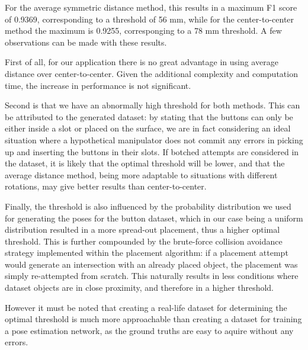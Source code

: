 For the average symmetric distance method, this results in a maximum F1 score of 0.9369, corresponding to a threshold of 56 mm, while for the center-to-center method the maximum is 0.9255, corresponging to a 78 mm threshold. A few observations can be made with these results.

First of all, for our application there is no great advantage in using average distance over center-to-center. Given the additional complexity and computation time, the increase in performance is not significant.

Second is that we have an abnormally high threshold for both methods. This can be attributed to the generated dataset: by stating that the buttons can only be either inside a slot or placed on the surface, we are in fact considering an ideal situation where a hypothetical manipulator does not commit any errors in picking up and inserting the buttons in their slots. If botched attempts are considered in the dataset, it is likely that the optimal threshold will be lower, and that the average distance method, being more adaptable to situations with different rotations, may give better results than center-to-center.

Finally, the threshold is also influenced by the probability distribution we used for generating the poses for the button dataset, which in our case being a uniform distribution resulted in a more spread-out placement, thus a higher optimal threshold. This is further compounded by the brute-force collision avoidance strategy implemented within the placement algorithm: if a placement attempt would generate an intersection with an already placed object, the placement was simply re-attempted from scratch. This naturally results in less conditions where dataset objects are in close proximity, and therefore in a higher threshold.

However it must be noted that creating a real-life dataset for determining the optimal threshold is much more approachable than creating a dataset for training a pose estimation network, as the ground truths are easy to aquire without any errors.